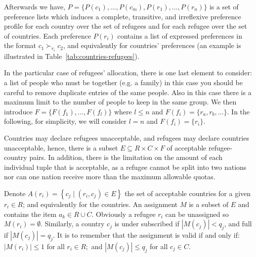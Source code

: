 \documentclass[letterpaper]{article} %
\begin{document}
    Afterwards we have, \(P = \{P(c_1), \dots , P(c_m), P(r_1), \dots , P(r_n)\}\) is
    a set of preference lists which induces a complete, transitive, and irreflexive preference profile for each
    country over the set of refugees and for each refugee over the set of countries.
    Each preference \(P(r_i)\) contains a list of expressed preferences in the format
    \( c _ { 1 } \succ_{r _ { i }} c _ { 2 } \),
    and equivalently for countries' preferences (an example is illustrated in Table~\ref{tab:countries-refugees}).

    In the particular case of refugees' allocation, there is one last element to consider: a list of people who must be together (e.g. a family)
    in this case you should be careful to remove duplicate entries of the same people.
    Also in this case there is a maximum limit to the number of people to keep in the same group.
    We then introduce \(F=\{F(f_1), \dots, F(f_l)\}\) where \(l\leq n\) and \(F(f_i) = \{r_a, r_b, \dots\}\).
    In the following, for simplicity, we will consider \(l=n\) and \(F(f_i)=\{r_i\}\).

    Countries may declare refugees unacceptable, and refugees may declare countries unacceptable,
    hence, there is a subset \(E \subseteq R \times C \times F\) of acceptable refugee-country pairs.
    In addition, there is the limitation on the amount of each individual tuple that is acceptable, as a refugee cannot
    be split into two nations nor can one nation receive more than the maximum allowable quotas.

    Denote \( A \left( r _ { i } \right) = \left\{ c _ { j } \mid \left( r _ { i } , c _ { j } \right) \in E \right\} \)
    the set of acceptable countries for a given \( r _ { i } \in R \); and equivalently for the countries.
    An assignment \(M\) is a subset of \(E\) and contains the item \( a _ { k } \in R \cup C \).
    Obviously a refugee \( r _ { i } \) can be unassigned so \( M \left( r _ { i } \right) = \emptyset \).
    Similarly, a country \( c _ { j } \) is
    under subscribed if \( \left| M \left( c _ { j } \right) \right| < q _ { j } \), and full if
    \( \left| M \left( c _ { j } \right) \right| = q _ { j } \).
    It is to remember that the assignment is valid if and only if:
    \( \left| M \left( r _ { i } \right) \right| \leq 1 \) for all \( r _ { i } \in R ; \) and
    \( \left| M \left( c _ { j } \right) \right| \leq q _ { j } \) for all \( c _ { j } \in C  \).
\end{document}
